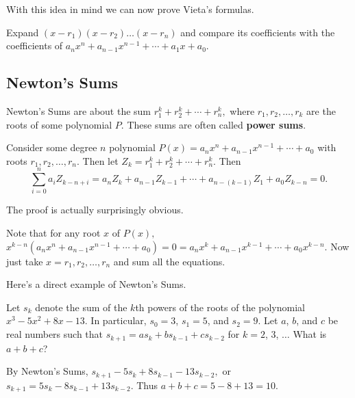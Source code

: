 \documentclass[mast]{lucky}
\begin{document}

With this idea in mind we can now prove Vieta's formulas.

\begin{pro}
Expand $(x-r_1)(x-r_2)\ldots(x-r_n)$ and compare its coefficients with the coefficients of $a_nx^n+a_{n-1}x^{n-1}+\cdots+a_{1}x+a_0.$
\end{pro}
\newpage
\subsection{Newton's Sums}

Newton's Sums are about the sum $r_1^k+r_2^k+\cdots+r_n^k,$ where $r_1,r_2,\ldots,r_k$ are the roots of some polynomial $P.$ These sums are often called \textbf{power sums}.

\begin{theo}
Consider some degree $n$ polynomial $P(x)=a_nx^n+a_{n-1}x^{n-1}+\cdots+a_0$ with roots $r_1,r_2,\ldots,r_n.$ Then let $Z_k=r_1^k+r_2^k+\cdots+r_n^k.$ Then
\[\sum_{i=0}^{n}a_iZ_{k-n+i}=a_nZ_k+a_{n-1}Z_{k-1}+\cdots+a_{n-(k-1)}Z_1+a_{0}Z_{k-n}=0.\]
\end{theo}

The proof is actually surprisingly obvious.

\begin{pro}
Note that for any root $x$ of $P(x),$ $x^{k-n}(a_nx^n+a_{n-1}x^{n-1}+\cdots+a_0)=0=a_nx^k+a_{n-1}x^{k-1}+\cdots+a_0x^{k-n}.$ Now just take $x=r_1,r_2,\ldots,r_n$ and sum all the equations.
\end{pro}

Here's a direct example of Newton's Sums.

\begin{exam}[AMC 12A 2019/17]
Let $s_k$ denote the sum of the $\textit{k}$th powers of the roots of the polynomial $x^3-5x^2+8x-13$. In particular, $s_0=3$, $s_1=5$, and $s_2=9$. Let $a$, $b$, and $c$ be real numbers such that $s_{k+1} = as_k + bs_{k-1} + cs_{k-2}$ for $k=2$, $3$, $\ldots$ What is $a+b+c$?
\end{exam}

\begin{sol}
By Newton's Sums, $s_{k+1}-5s_k+8s_{k-1}-13s_{k-2},$ or $s_{k+1}=5s_k-8s_{k-1}+13s_{k-2}.$ Thus $a+b+c=5-8+13=10.$
\end{sol}
\end{document}

